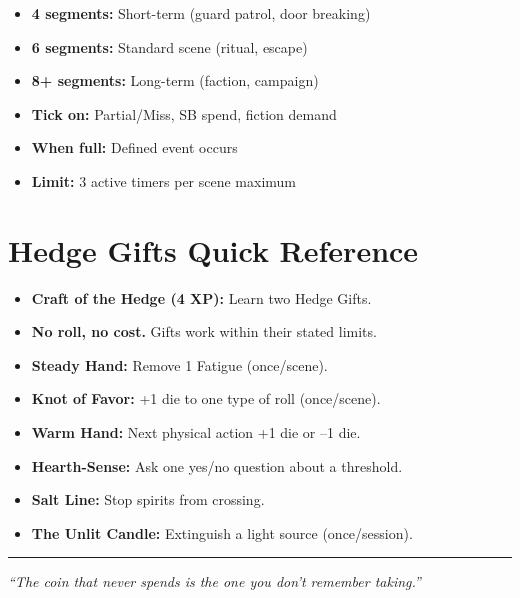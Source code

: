 \documentclass[11pt]{book}
\begin{document}
\begin{itemize}
  \item \textbf{4 segments:} Short-term (guard patrol, door breaking)
  \item \textbf{6 segments:} Standard scene (ritual, escape)
  \item \textbf{8+ segments:} Long-term (faction, campaign)
  \item \textbf{Tick on:} Partial/Miss, SB spend, fiction demand
  \item \textbf{When full:} Defined event occurs
  \item \textbf{Limit:} 3 active timers per scene maximum
\end{itemize}

\section{Hedge Gifts Quick Reference}

\begin{itemize}
  \item \textbf{Craft of the Hedge (4 XP):} Learn two Hedge Gifts.
  \item \textbf{No roll, no cost.} Gifts work within their stated limits.
  \item \textbf{Steady Hand:} Remove 1 Fatigue (once/scene).
  \item \textbf{Knot of Favor:} +1 die to one type of roll (once/scene).
  \item \textbf{Warm Hand:} Next physical action +1 die or --1 die.
  \item \textbf{Hearth-Sense:} Ask one yes/no question about a threshold.
  \item \textbf{Salt Line:} Stop spirits from crossing.
  \item \textbf{The Unlit Candle:} Extinguish a light source (once/session).
\end{itemize}

\vspace{1cm}
\begin{center}
  \rule{0.8\textwidth}{0.5pt}
  \vspace{0.5cm}

  \textit{``The coin that never spends is the one you don't remember taking.''}
\end{center}
\end{document}
